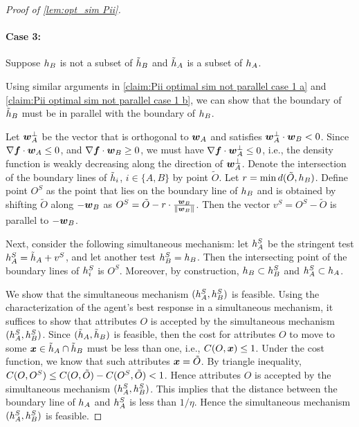 \begin{proof}[Proof of \cref{lem:opt_sim Pii}]
\paragraph{Case 3:} Suppose $h_B$ is not a subset of $\tilde{h}_B$
 and  $\tilde{h}_A$ is a subset of $h_A$.


    Using similar arguments in  \cref{claim:Pii optimal sim not parallel case 1 a} and \cref{claim:Pii optimal sim not parallel case 1 b}, we can show that the boundary of $\tilde{h}_B$ must be in parallel with the boundary of $h_B$. 

   Let $\boldsymbol{w}_A^{\perp}$ be the vector that is orthogonal to $\boldsymbol{w}_A$ and satisfies $\boldsymbol{w}_A^{\perp} \cdot \boldsymbol{w}_B<0$.
   Since $\nabla \boldsymbol{f} \cdot \boldsymbol{w}_A \leq 0$, and $\nabla \boldsymbol{f} \cdot \boldsymbol{w}_B \geq 0$, we must have $\nabla \boldsymbol{f} \cdot \boldsymbol{w}_A^{\perp} \leq 0$, i.e., the density function is weakly decreasing along the direction of $\boldsymbol{w}_A^{\perp}$.
  Denote the intersection of the boundary lines of $\tilde{h}_i$, $i\in \{A,B\}$ by point $\tilde O$.
Let $r=\min d(\tilde O,h_B)$.
Define point $O^S$ as the point that lies on the boundary line of $h_B$ and is obtained by shifting $\tilde O$ along $-\boldsymbol{w}_B$ as $O^S= \tilde O-r\cdot \frac{\boldsymbol{w}_B}{\lVert \boldsymbol{w}_B \rVert }$.
Then the vector $v^S = O^S- \tilde O$ is parallel to $-\boldsymbol{w}_B$.
    
    Next, consider the following simultaneous mechanism: 
    let $h_A^S$ be the stringent test $h_A^S=\tilde{h}_A+v^S$, and let another test $h_B^S =h_B$.
    Then the intersecting point of the boundary lines of $h_i^S$ is $O^S$.
    Moreover, by construction, $h_B\subset h_B^S$ and $h_A^S\subset h_A$.
    
    We show that  the simultaneous mechanism $(h_A^S,h_B^S)$ is feasible.
    Using the characterization of the agent's best response in a simultaneous mechanism, it suffices to show that attributes $O$ is accepted by  the simultaneous mechanism $(h_A^S,h_B^S)$.
    Since $(\tilde{h}_A,\tilde{h}_B)$ is feasible, then the cost for attributes $O$ to move to some $\boldsymbol{x}\in \tilde{h}_A\cap\tilde{h}_B$ must be less than one, i.e., $C(O,\boldsymbol{x})\leq 1$.
    Under the cost function, we know that such attributes $\boldsymbol{x}=\tilde O$.
    By triangle inequality, $C(O,O^S)\leq C(O,\tilde O) - C(O^S,\tilde O)< 1$.
    Hence attributes $O$ is accepted by  the simultaneous mechanism $(h_A^S,h_B^S)$.
    This implies that the distance between the boundary line of $h_A$ and $h_A^S$ is less than $1/\eta$.
    Hence the simultaneous mechanism $(h_A^S,h_B^S)$ is feasible.


\end{proof}
